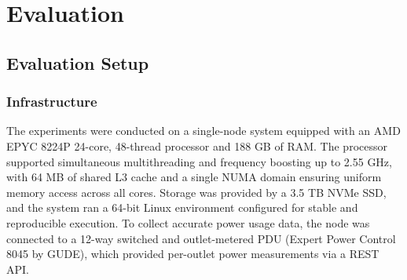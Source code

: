 \section{Evaluation}
\label{cha:evaluation}
\subsection{Evaluation Setup}
\label{sec:evaluation_setup}
\subsubsection{Infrastructure}
\label{sec:evaluation_infrastructure}
The experiments were conducted on a single-node system equipped with an AMD EPYC 8224P 24-core, 48-thread processor and 188 GB of RAM. The processor supported simultaneous multithreading and frequency boosting up to 2.55 GHz, with 64 MB of shared L3 cache and a single NUMA domain ensuring uniform memory access across all cores. Storage was provided by a 3.5 TB NVMe SSD, and the system ran a 64-bit Linux environment configured for stable and reproducible execution.
To collect accurate power usage data, the node was connected to a 12-way switched and outlet-metered PDU (Expert Power Control 8045 by GUDE), which provided per-outlet power measurements via a REST API.

